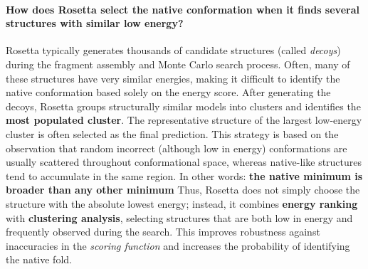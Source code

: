 \paragraph{How does Rosetta select the native conformation when it finds several structures with similar low energy?}
Rosetta typically generates thousands of candidate structures (called \emph{decoys}) during the fragment assembly and Monte Carlo search process. Often, many of these structures have very similar energies, making it difficult to identify the native conformation based solely on the energy score.
After generating the decoys, Rosetta groups structurally similar models into clusters and identifies the \textbf{most populated cluster}. The representative structure of the largest low-energy cluster is often selected as the final prediction. This strategy is based on the observation that random incorrect (although low in energy) conformations are usually scattered throughout conformational space, whereas native-like structures tend to accumulate in the same region.
In other words: \textbf{the native minimum is broader than any other minimum}
Thus, Rosetta does not simply choose the structure with the absolute lowest energy; instead, it combines \textbf{energy ranking} with \textbf{clustering analysis}, selecting structures that are both low in energy and frequently observed during the search. This improves robustness against inaccuracies in the \textit{scoring function} and increases the probability of identifying the native fold.



